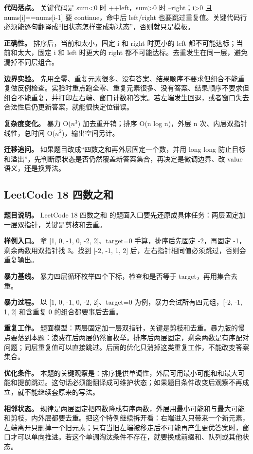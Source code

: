 \textbf{代码落点。} 关键代码是 sum<0 时 ++left，sum>0 时 --right；i>0 且 nums[i]==nums[i-1] 要 continue，命中后 left/right 也要跳过重复值。关键代码行必须能逐句翻译成“旧状态怎样变成新状态”，否则就只是模板。

\textbf{正确性。} 排序后，当前和太小，固定 i 和 right 时更小的 left 都不可能达标；当前和太大，固定 i 和 left 时更大的 right 都不可能达标。去重发生在同一层，避免漏掉不同层组合。

\textbf{边界实验。} 先用全零、重复元素很多、没有答案、结果顺序不要求但组合不能重复做反例检查。实验时重点跑全零、重复元素很多、没有答案、结果顺序不要求但组合不能重复，并打印左右端、窗口计数和答案。若左端发生回退，或者窗口失去合法性后仍更新答案，就能很快定位错误。

\textbf{复杂度变化。} 暴力 O(\ensuremath{n^{3}}) 加去重开销；排序 O(n log n)，外层 n 次、内层双指针线性，总时间 O(\ensuremath{n^{2}})，输出空间另计。

\textbf{迁移追问。} 如果题目改成“四数之和再外层固定一个数，并用 long long 防止目标和溢出”，先判断原状态是否仍然覆盖新答案集合，再决定是微调边界、改 value 语义，还是换算法。

\subsection{LeetCode 18 四数之和}

\textbf{题目说明。} LeetCode 18 四数之和 的题面入口要先还原成具体任务：两层固定加一层双指针，关键是剪枝和去重。

\textbf{样例入口。} 拿 [1, 0, -1, 0, -2, 2]、target=0 手算，排序后先固定 -2，再固定 -1，剩余两数用双指针找 3。找到 [-2, -1, 1, 2] 后，左右指针相同值必须跳过，否则会重复输出。

\textbf{暴力基线。} 暴力四层循环枚举四个下标，检查和是否等于 target，再用集合去重。

\textbf{暴力过程。} 以 [1, 0, -1, 0, -2, 2]、target=0 为例，暴力会试所有四元组，[-2, -1, 1, 2] 和含重复 0 的组合都要事后去重。

\textbf{重复工作。} 题面模型：两层固定加一层双指针，关键是剪枝和去重。暴力版的慢点要落到本题：浪费在后两层仍然盲枚举。排序后两层固定，剩余两数是有序配对问题；同层重复值可以直接跳过。后面的优化只消掉这类重复工作，不能改变答案集合。

\textbf{优化条件。} 本题的关键观察是：排序提供单调性，外层可用最小可能和和最大可能和提前跳过。这句话必须能翻译成可维护状态；如果题目条件改变后观察不再成立，就不能继续套原来的写法。

\textbf{相邻状态。} 规律是两层固定把四数降成有序两数，外层用最小可能和与最大可能和剪枝，内外层都要去重。把这个特例继续拆开看：右端进入只带来一个新元素，左端离开只删掉一个旧元素；只有当旧左端被移走后不可能再产生更优答案时，窗口才可以单向推进。若这个单调淘汰条件不存在，就要换成前缀和、队列或其他状态。

